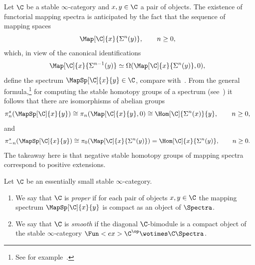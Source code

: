 \documentclass[a4paper]{amsart}
\begin{document}
\begin{remark}
  \label{rmk:mapping-spectra}
  Let $\C$ be a stable $\infty$-category and $x,y\in\C$ a pair of objects. The
  existence of functorial mapping spectra is anticipated by the fact that the sequence
  of mapping spaces
  \[
    \Map[\C]{x}{\Sigma^n(y)},\qquad n\geq0,
  \]
  which, in view of the canonical identifications
  \[
    \Map[\C]{x}{\Sigma^{n-1}(y)}\simeq\Omega(\Map[\C]{x}{\Sigma^n(y)},0),
  \]
  define the spectrum $\MapSp[\C]{x}{y}\in\C$, compare with~.
  From the general formula,\footnote{See for
    example~\cite[Remark~3.9]{Gre07}.} for computing the stable homotopy groups of a spectrum
  (see~) it follows that there are isomorphisms of
  abelian groups
  \[
    \pi_n^s(\MapSp[\C]{x}{y})\cong\pi_n(\Map[\C]{x}{y},0)\cong\Hom[\C]{\Sigma^n(x)}{y},\qquad
    n\geq0,
  \]
  and
  \[
    \pi_{-n}^s(\MapSp[\C]{x}{y})\cong\pi_0(\Map[\C]{x}{\Sigma^n(y)})=\Hom[\C]{x}{\Sigma^n(y)},\qquad
    n\geq0.
  \]
  The takeaway here is that negative stable homotopy groups of mapping spectra correspond to
  positive extensions.
\end{remark}

\begin{definition}[Kontsevich]
  Let $\C$ be an essentially small stable $\infty$-category.
  \begin{enumerate}
  \item We say that $\C$ is \emph{proper} if for each pair of objects $x,y\in\C$
    the mapping spectrum $\MapSp[\C]{x}{y}$ is compact as an object of $\Spectra$.
  \item We say that $\C$ is \emph{smooth} if the diagonal $\C$-bimodule
    is a compact object of the stable $\infty$-category
    $\Fun<ex>{\C^\op\wotimes\C}{\Spectra}$.
  \end{enumerate}
\end{definition}
\end{document}
